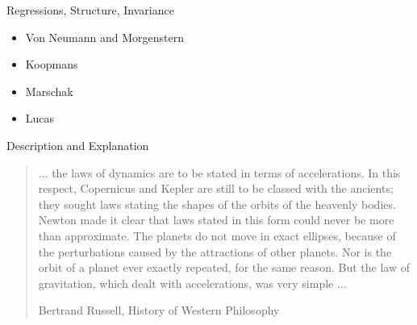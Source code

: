 \documentclass[aspectratio=169]{beamer}
\theoremstyle{Definition}
\begin{document}
\begin{frame}{Regressions, Structure, Invariance}

\begin{itemize}
\item Von Neumann and Morgenstern
\item Koopmans
\item Marschak
\item Lucas
\end{itemize}


\end{frame}

\begin{frame}{Description and Explanation}

\begin{quote}

$\ldots$  the laws of dynamics are to be stated in terms of accelerations. In this respect, Copernicus and Kepler are still to be classed with the ancients; they sought laws stating the shapes of the orbits of the heavenly bodies. Newton made it clear that laws stated in this form could never be more than approximate. The planets do not move in exact ellipses, because of the perturbations caused by the attractions of other planets. Nor is the orbit of a planet ever exactly repeated, for the same reason. But the law of gravitation, which dealt with accelerations, was very simple $\ldots$

\quad \quad Bertrand Russell, History of Western Philosophy

\end{quote}


\end{frame}
\end{document}
